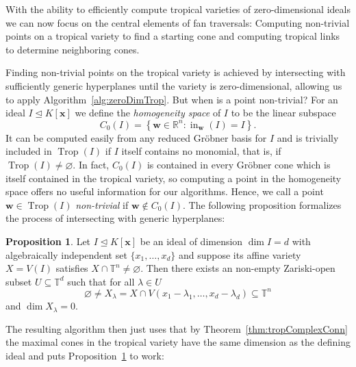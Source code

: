 \documentclass[
  paper=a4,
  titlepage,
  bibliography=totoc,
  listof=totoc,
  pagesize=pdftex
]{scrartcl}
\numberwithin{figure}{section}
\numberwithin{equation}{section}
\numberwithin{table}{section}
\newcommand*\setR{\mathds{R}}
\newcommand*\setT{\mathds{T}}
\let\vec\mathbf
\let\idealof\trianglelefteq
\DeclareMathOperator{\Trop}{Trop}
\DeclareMathOperator{\initial}{in}
\theoremstyle{definition}
\newtheorem{proposition}[definition]{Proposition}
\numberwithin{definition}{section}
\begin{document}
With the ability to efficiently compute tropical varieties of zero-dimensional ideals we
can now focus on the central elements of fan traversals: Computing non-trivial points on a
tropical variety to find a starting cone and computing tropical links to determine
neighboring cones.

Finding non-trivial points on the tropical variety is achieved by intersecting with
sufficiently generic hyperplanes until the variety is zero-dimensional, allowing us to
apply Algorithm~\ref{alg:zeroDimTrop}. But when is a point non-trivial? For an ideal $I
\idealof K[\vec x]$ we define the \emph{homogeneity space} of $I$ to be the linear
subspace
\[
  C_0(I) = \left\{ \vec w \in \setR^n : \initial_{\vec w}(I) = I \right\}.
\]
It can be computed easily from any reduced Gröbner basis for $I$ and is trivially included
in $\Trop(I)$ if $I$ itself contains no monomial, that is, if $\Trop(I) \neq \varnothing$.
In fact, $C_0(I)$ is contained in every Gröbner cone which is itself contained in the
tropical variety, so computing a point in the homogeneity space offers no useful
information for our algorithms. Hence, we call a point $\vec w \in \Trop(I)$
\emph{non-trivial} if $\vec w \not\in C_0(I)$. The following proposition formalizes the
process of intersecting with generic hyperplanes:

\begin{proposition}
  Let $I \idealof K[\vec x]$ be an ideal of dimension $\dim I = d$ with algebraically
  independent set $\{x_1, \dots, x_d\}$ and suppose its affine variety $X = V(I)$
  satisfies $X \cap \setT^n \neq \varnothing$. Then there exists an non-empty Zariski-open
  subset $U \subseteq \setT^d$ such that for all $\lambda \in U$
  \[
    \varnothing \neq X_\lambda =
    X \cap V(x_1-\lambda_1, \dots, x_d - \lambda_d) \subseteq \setT^n
  \]
  and $\dim X_\lambda = 0$.
  \label{prp:intersHyperp}
\end{proposition}

The resulting algorithm then just uses that by Theorem~\ref{thm:tropComplexConn} the
maximal cones in the tropical variety have the same dimension as the defining ideal and
puts Proposition~\ref{prp:intersHyperp} to work:
\end{document}
